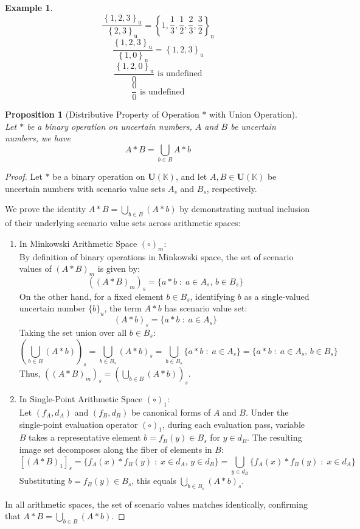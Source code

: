 \documentclass[a4paper,12pt, twoside]{memoir}
\newtheorem{md}{Proposition}[chapter]
\newtheorem{example}{Example}[chapter]
\newcommand{\set}[1]{\left\{#1\right\}} %
\newcommand{\s}[1]{\set{#1}_\mathrm{u}} %
\newcommand{\tsbd}[1]{\mathbf{U}(\mathbb{#1})}
\newcommand{\kgdd}[1]{\left(#1\right)_1} %
\begin{document}
\begin{example}
	$$\frac{\s{1,2,3}}{\s{2,3}} = \s{1,\frac{1}{3},\frac{1}{2},\frac{2}{3},\frac{3}{2}}$$
	$$\frac{\s{1,2,3}}{\s{1,0}} = \s{1,2,3}$$
	$$\frac{\s{1,2,0}}{0} \text{ is undefined}$$
	$$\frac{0}{0} \text{ is undefined}$$
\end{example}

\begin{md}[Distributive Property of Operation $*$ with Union Operation]
	Let $*$ be a binary operation on uncertain numbers, $A$ and $B$ be uncertain numbers, we have
	\[A*B = \bigcup_{b \in B} {A * b} \]
\end{md}
\begin{proof}
	Let $*$ be a binary operation on $\tsbd{K}$, and let $A, B \in \tsbd{K}$ be uncertain numbers with scenario value sets $A_s$ and $B_s$, respectively.

	We prove the identity $A * B = \bigcup_{b \in B} (A * b)$ by demonstrating mutual inclusion of their underlying scenario value sets across arithmetic spaces:

	\begin{enumerate}[leftmargin=*]
		\item In Minkowski Arithmetic Space $(\circ)_m$: \\
		      By definition of binary operations in Minkowski space, the set of scenario values of $(A * B)_m$ is given by:
		      \[
			      ((A * B)_m)_s = \{a * b \;:\; a \in A_s, \, b \in B_s\}
		      \]
		      On the other hand, for a fixed element $b \in B_s$, identifying $b$ as a single-valued uncertain number $\{b\}_u$, the term $A * b$ has scenario value set:
		      \[
			      (A * b)_s = \{a * b \;:\; a \in A_s\}
		      \]
		      Taking the set union over all $b \in B_s$:
		      \[
			      \left( \bigcup_{b \in B} (A * b) \right)_s = \bigcup_{b \in B_s} (A * b)_s = \bigcup_{b \in B_s} \{a * b \;:\; a \in A_s\} = \{a * b \;:\; a \in A_s, \, b \in B_s\}
		      \]
		      Thus, $((A * B)_m)_s = \left( \bigcup_{b \in B} (A * b) \right)_s$.

		\item In Single-Point Arithmetic Space $(\circ)_1$: \\
		      Let $(f_A, d_A)$ and $(f_B, d_B)$ be canonical forms of $A$ and $B$. Under the single-point evaluation operator $\kgdd{\circ}$, during each evaluation pass, variable $B$ takes a representative element $b = f_B(y) \in B_s$ for $y \in d_B$. The resulting image set decomposes along the fiber of elements in $B$:
		      \[
			      [\kgdd{A * B}]_s = \{f_A(x) * f_B(y) \;:\; x \in d_A, \, y \in d_B\} = \bigcup_{y \in d_B} \{f_A(x) * f_B(y) \;:\; x \in d_A\}
		      \]
		      Substituting $b = f_B(y) \in B_s$, this equals $\bigcup_{b \in B_s} (A * b)_s$.
	\end{enumerate}

	In all arithmetic spaces, the set of scenario values matches identically, confirming that $A * B = \bigcup_{b \in B} (A * b)$.
\end{proof}
\end{document}

